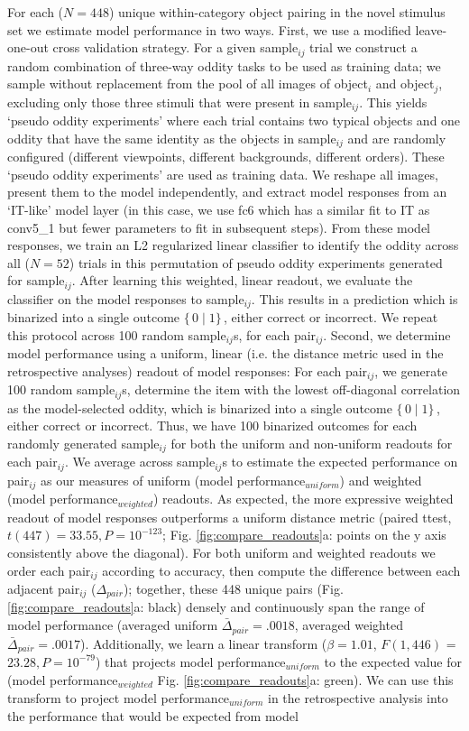\documentclass[11pt]{article}
\begin{document}
For each ($N=448$) unique within-category object pairing in the novel stimulus set we estimate model performance in two ways. First, we use a modified leave-one-out cross validation strategy. For a given sample$_{ij}$ trial we construct a random combination of three-way oddity tasks to be used as training data; we sample without replacement from the pool of all images of object$_{i}$ and object$_{j}$, excluding only those three stimuli that were present in sample$_{ij}$. This yields `pseudo oddity experiments' where each trial contains two typical objects and one oddity that have the same identity as the objects in sample$_{ij}$ and are randomly configured (different viewpoints, different backgrounds, different orders). These `pseudo oddity experiments' are used as training data. We reshape all images, present them to the model independently, and extract model responses from an `IT-like' model layer (in this case, we use fc6 which has a similar fit to IT as conv5\_1 but fewer parameters to fit in subsequent steps). From these model responses, we train an L2 regularized linear classifier to identify the oddity across all ($N=52$) trials in this permutation of pseudo oddity experiments generated for sample$_{ij}$. After learning this weighted, linear readout, we evaluate the classifier on the model responses to sample$_{ij}$. This results in a prediction which is binarized into a single outcome $\{\, 0 \mid 1 \}\,$, either correct or incorrect. We repeat this protocol across 100 random sample$_{ij}$s, for each pair$_{ij}$. Second, we determine model performance using a uniform, linear (i.e. the distance metric used in the retrospective analyses) readout of model responses: For each pair$_{ij}$, we generate 100 random sample$_{ij}$s, determine the item with the lowest off-diagonal correlation as the model-selected oddity, which is binarized into a single outcome $\{\, 0 \mid 1 \}\,$, either correct or incorrect. Thus, we have 100 binarized outcomes for each randomly generated sample$_{ij}$ for both the uniform and non-uniform readouts for each pair$_{ij}$. We average across sample$_{ij}$s to estimate the expected performance on pair$_{ij}$ as our measures of uniform (model performance$_{uniform}$) and weighted (model performance$_{weighted}$) readouts. As expected, the more expressive weighted readout of model responses outperforms a uniform distance metric (paired ttest, $t(447) =33.55, P = 10^{-123}$; Fig. \ref{fig:compare_readouts}a: points on the y axis consistently above the diagonal). For both uniform and weighted readouts we order each pair$_{ij}$ according to accuracy, then compute the difference between each adjacent pair$_{ij}$ ($\Delta_{pair}$); together, these 448 unique pairs (Fig. \ref{fig:compare_readouts}a: black) densely and continuously span the range of model performance (averaged uniform $\bar\Delta_{pair}=.0018$, averaged weighted $\bar\Delta_{pair}=.0017$). Additionally, we learn a linear transform ($\beta = 1.01$, $F(1, 446)$ = $23.28, P = 10 ^{-79}$) that projects model performance$_{uniform}$ to the expected value for (model performance$_{weighted}$ Fig. \ref{fig:compare_readouts}a: green). We can use this transform to project model performance$_{uniform}$ in the retrospective analysis into the performance that would be expected from model 
\end{document}
